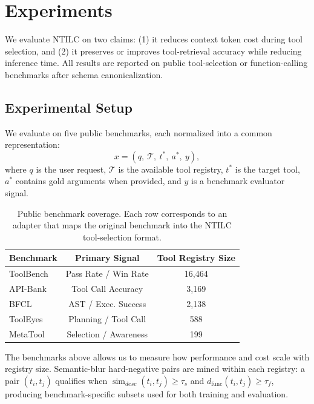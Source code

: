 \documentclass{article}
\begin{document}
\section{Experiments}

We evaluate NTILC on two claims: (1) it reduces context token cost during tool selection, and (2) it preserves or improves tool-retrieval accuracy while reducing inference time.
All results are reported on public tool-selection or function-calling benchmarks after schema canonicalization.

\subsection{Experimental Setup}

We evaluate on five public benchmarks, each normalized into a common representation:
\begin{equation}
    x = (q,\ \mathcal{T},\ t^*,\ a^*,\ y),
\end{equation}
where $q$ is the user request, $\mathcal{T}$ is the available tool registry, $t^*$ is the target tool, $a^*$ contains gold arguments when provided, and $y$ is a benchmark evaluator signal.

\begin{table}[H]
\caption{Public benchmark coverage. Each row corresponds to an adapter that maps the original benchmark into the NTILC tool-selection format.}
\label{tab:benchmarks}
\centering
\small
\begin{tabular}{lcc}
\toprule
Benchmark & Primary Signal & Tool Registry Size \\
\midrule
ToolBench \cite{qin2023toolllmfacilitatinglargelanguage}    & Pass Rate / Win Rate   & 16,464 \\
API-Bank \cite{li2023apibankcomprehensivebenchmarktoolaugmented}     & Tool Call Accuracy     & 3,169 \\
BFCL \cite{patil2025the}         & AST / Exec. Success    & 2,138 \\
ToolEyes \cite{ye2024tooleyesfinegrainedevaluationtool}     & Planning / Tool Call   & 588 \\
MetaTool \cite{huang2024metatoolbenchmarklargelanguage}     & Selection / Awareness  & 199 \\
\bottomrule
\end{tabular}
\end{table}

The benchmarks above allows us to measure how performance and cost scale with registry size.
Semantic-blur hard-negative pairs are mined within each registry: a pair $(t_i, t_j)$ qualifies when $\operatorname{sim}_{desc}(t_i,t_j) \geq \tau_s$ and $d_{\text{func}}(t_i,t_j) \geq \tau_f$, producing benchmark-specific subsets used for both training and evaluation.
\end{document}
